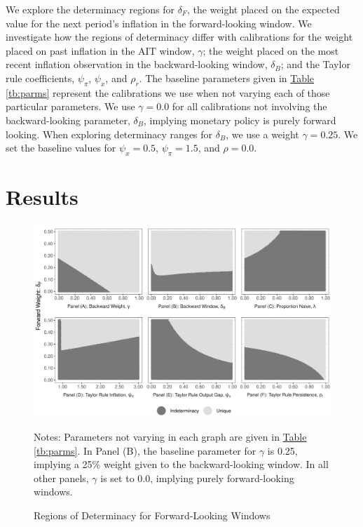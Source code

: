 \documentclass[english,authoryear,12pt]{elsarticle}
\begin{document}
We explore the determinacy regions for $\delta_F$, the weight placed on the expected value for the next period's inflation in the forward-looking window. We investigate how the regions of determinacy differ with calibrations for the weight placed on past inflation in the AIT window, $\gamma$; the weight placed on the most recent inflation observation in the backward-looking window, $\delta_B$; and the Taylor rule coefficients, $\psi_\pi$, $\psi_x$, and $\rho_r$. The baseline parameters given in \href{tb:parms}{Table} \ref{tb:parms} represent the calibrations we use when not varying each of those particular parameters. We use $\gamma=0.0$ for all calibrations not involving the backward-looking parameter, $\delta_B$, implying monetary policy is purely forward looking. When exploring determinacy ranges for $\delta_B$, we use a weight $\gamma=0.25$. We set the baseline values for $\psi_x=0.5$, $\psi_\pi = 1.5$, and $\rho=0.0$.

\section{Results}

\begin{figure}
	\captionsetup{justification=centering}
	\begin{center}
		\includegraphics[width=\textwidth]{./determinacy_notitle.png}
		\vspace*{3pc}\hspace*{2pc}\parbox{0.9\textwidth}{\small{
			Notes: Parameters not varying in each graph are given in \href{tb:parms}{Table} \ref{tb:parms}. In Panel (B), the baseline parameter for $\gamma$ is 0.25, implying a 25\% weight given to the backward-looking window. In all other panels, $\gamma$ is set to 0.0, implying purely forward-looking windows.}
		}
	\end{center}
	\vspace*{-4pc}\caption{Regions of Determinacy for Forward-Looking Windows}\label{fg:determinacy}
\end{figure}
\end{document}

